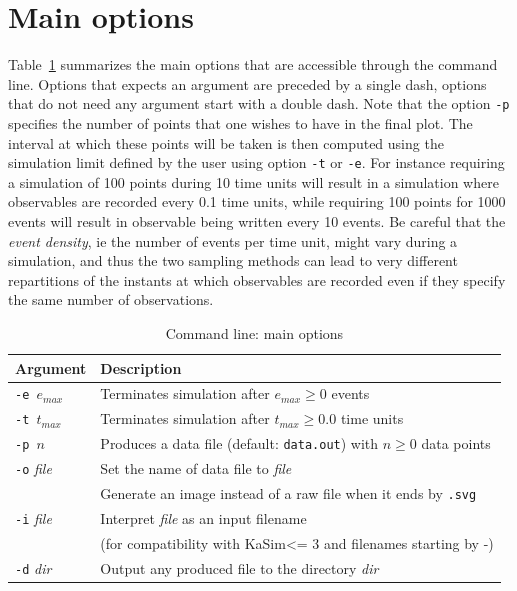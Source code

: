 \documentclass[11pt]{book}
\def\KaSim{\textsf{KaSim}}
\def\ttt#1{\texttt{#1}}
\def\ie{ie }
\def\mit#1{{\mathit #1}}
\begin{document}
\section{Main options}

Table~\ref{tab:options} summarizes the main options that are accessible through the command line. Options that expects an argument are preceded by a single dash, options that do not need any argument start with a double dash. Note that the option \ttt{-p} specifies the number of points that one wishes to have in the final plot. The interval at which these points will be taken is then computed using the simulation limit defined by the user using option \ttt{-t} or \ttt{-e}. For instance requiring a simulation of 100 points during 10 time units will result in a simulation where observables are recorded every 0.1 time units, while requiring 100 points for 1000 events will result in observable being written every 10 events. Be careful that the \emph{event density}, \ie the number of events per time unit, might vary during a simulation, and thus the two sampling methods can lead to very different repartitions of the instants at which observables are recorded even if they specify the same number of observations. 

\begin{table}[h!]
\caption{Command line: main options}
\centering
\begin{tabular}{|l|l|}
\hline 
Argument & Description \\ \hline
\ttt{-e $e_{\mit{max}}$} & Terminates simulation after $e_{\mit{max}}\geq 0$ events\\
\ttt{-t $t_{\mit{max}}$} & Terminates simulation after $t_{\mit{max}}\geq 0.0$ time units\\
\ttt{-p $n$} & Produces a data file\index{data file} (default: \ttt{data.out}) with $n\geq 0$ data points\\
\ttt{-o} \textit{file} & Set the name of data file to \textit{file}\\
&Generate an image instead of a raw file when it ends by \verb$.svg$\\
\ttt{-i} \textit{file} & Interpret \textit{file} as an input filename\\
& (for compatibility with \KaSim <= 3 and filenames starting by -)\\
\ttt{-d} \textit{dir} & Output any produced file to the directory \textit{dir}\\
\hline
\end{tabular}
\label{tab:options}
\end{table}%
\end{document}

